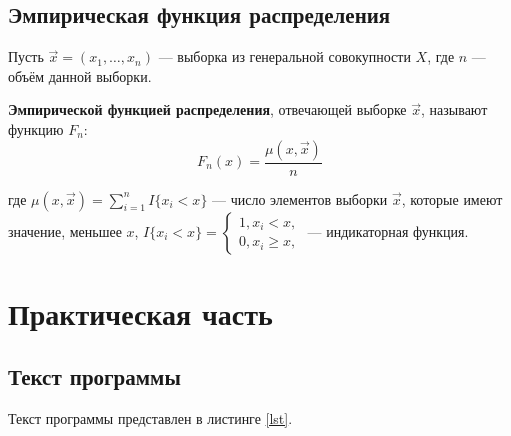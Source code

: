 \section{Эмпирическая функция распределения}

Пусть $\vec{x} = (x_1, \dots, x_n)$ --- выборка из генеральной совокупности $X$, где $n$ --- объём данной выборки.

\textbf{Эмпирической функцией распределения}, отвечающей выборке $\vec x$, называют функцию $F_n$:
\begin{equation}
	F_n(x) = \frac{\mu(x, \vec x)}{n}
\end{equation}

где $\mu(x, \vec x) = \sum_{i=1}^n I\{x_i < x\}$ --- число элементов выборки $\vec x$, которые имеют значение, меньшее $x$, $I\{x_i < x\} = \begin{cases} 1, x_i < x, \\ 0, x_i \geq x, \end{cases}$ --- индикаторная функция.


\chapter{Практическая часть}
\section{Текст программы}
Текст программы представлен в листинге \ref{lst}.

